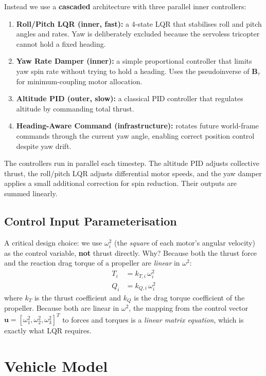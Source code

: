 \documentclass[12pt, a4paper]{article}
\newcommand{\bu}{\bm{u}}
\newcommand{\bB}{\bm{B}}
\begin{document}
Instead we use a \textbf{cascaded} architecture with three parallel inner controllers:
\begin{enumerate}[label=\arabic*.]
    \item \textbf{Roll/Pitch LQR (inner, fast):} a 4-state LQR that stabilises roll and pitch angles and rates.  Yaw is deliberately excluded because the servoless tricopter cannot hold a fixed heading.
    \item \textbf{Yaw Rate Damper (inner):} a simple proportional controller that limits yaw spin rate without trying to hold a heading.  Uses the pseudoinverse of $\bB_\tau$ for minimum-coupling motor allocation.
    \item \textbf{Altitude PID (outer, slow):} a classical PID controller that regulates altitude by commanding total thrust.
    \item \textbf{Heading-Aware Command (infrastructure):} rotates future world-frame commands through the current yaw angle, enabling correct position control despite yaw drift.
\end{enumerate}
The controllers run in parallel each timestep.  The altitude PID adjusts collective thrust, the roll/pitch LQR adjusts differential motor speeds, and the yaw damper applies a small additional correction for spin reduction.  Their outputs are summed linearly.

\subsection{Control Input Parameterisation}

A critical design choice: we use $\omega_i^2$ (the \emph{square} of each motor's angular velocity) as the control variable, \textbf{not} thrust directly.  Why?  Because both the thrust force and the reaction drag torque of a propeller are \emph{linear} in $\omega^2$:
\begin{align}
    T_i &= k_{T,i} \, \omega_i^2  \label{eq:thrust} \\
    Q_i &= k_{Q,i} \, \omega_i^2  \label{eq:drag}
\end{align}
where $k_T$ is the thrust coefficient and $k_Q$ is the drag torque coefficient of the propeller.  Because both are linear in $\omega^2$, the mapping from the control vector $\bu = [\omega_1^2, \omega_2^2, \omega_3^2]^T$ to forces and torques is a \emph{linear matrix equation}, which is exactly what LQR requires.

\section{Vehicle Model}
\end{document}

